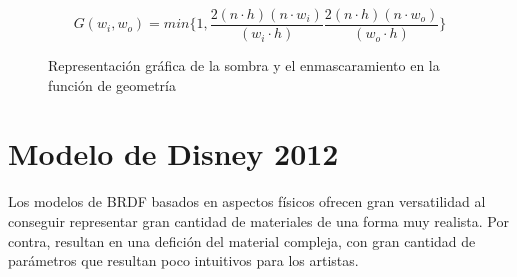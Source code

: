     
            \begin{equation}
            G(w_i, w_o) = min\bigg\{
            1,
            \frac{2(n\cdot{h})(n\cdot{w_i})}{(w_i\cdot{h})}
            \frac{2(n\cdot{h})(n\cdot{w_o})}{(w_o\cdot{h})}
            \bigg\}
            \end{equation}
    
            \begin{figure}[H]
                \vspace{0.5cm}
                \centering
                \caption{Representaci\'on gr\'afica de la sombra y el enmascaramiento en la funci\'on de geometr\'ia}
            \end{figure}
    
    
    
    \section{Modelo de Disney 2012}
    Los modelos de BRDF basados en aspectos f\'isicos ofrecen gran versatilidad al conseguir representar gran cantidad de materiales de una
    forma muy realista. Por contra, resultan en una defici\'on del material compleja, con gran cantidad de par\'ametros que resultan poco intuitivos para los artistas.\\
    
